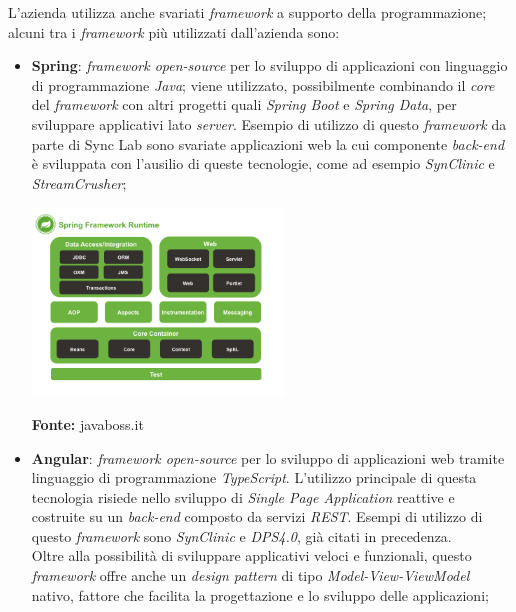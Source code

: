 L'azienda utilizza anche svariati \textit{framework} a supporto della programmazione; alcuni tra i \textit{framework} più utilizzati dall'azienda sono:
\begin{itemize}
  \item \textbf{Spring}: \textit{framework open-source} per lo sviluppo di applicazioni con linguaggio di programmazione \textit{Java}; viene utilizzato, possibilmente combinando il \textit{core} del \textit{framework} con altri progetti quali \textit{Spring Boot} e \textit{Spring Data}, per sviluppare applicativi lato \textit{server}. Esempio di utilizzo di questo \textit{framework} da parte di Sync Lab sono svariate applicazioni web la cui componente \textit{back-end} è sviluppata con l'ausilio di queste tecnologie, come ad esempio \textit{SynClinic} e \textit{StreamCrusher};

  \begin{minipage}{\linewidth}
    \centering
      \includegraphics[height=5cm]{immagini/spring}
    \caption*{\textbf{Fonte:} javaboss.it}
  \end{minipage}

  \item \textbf{Angular}: \textit{framework open-source} per lo sviluppo di applicazioni web tramite linguaggio di programmazione \textit{TypeScript}. L'utilizzo principale di questa tecnologia risiede nello sviluppo di \textit{Single Page Application} reattive e costruite su un \textit{back-end} composto da servizi \textit{REST}. Esempi di utilizzo di questo \textit{framework} sono \textit{SynClinic} e \textit{DPS4.0}, già citati in precedenza. \\
  Oltre alla possibilità di sviluppare applicativi veloci e funzionali, questo \textit{framework} offre anche un \textit{design pattern} di tipo \textit{Model-View-ViewModel} nativo, fattore che facilita la progettazione e lo sviluppo delle applicazioni;


\end{itemize}
